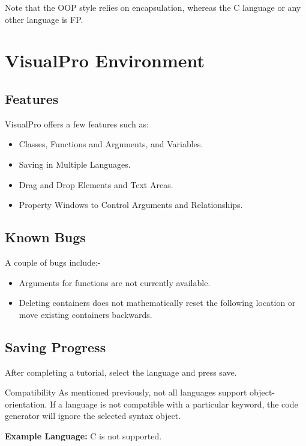 \documentclass[10pt]{article}
\begin{document}
    Note that the OOP style relies on encapsulation, whereas the C language or any other language is FP.

\newpage
\section{VisualPro Environment}
\label{sec:vp-env}
    \subsection{Features}
        VisualPro offers a few features such as:
        \begin{itemize}
            \item Classes, Functions and Arguments, and Variables.
            \item Saving in Multiple Languages.
            \item Drag and Drop Elements and Text Areas.
            \item Property Windows to Control Arguments and Relationships.
        \end{itemize}

    \subsection{Known Bugs}
        A couple of bugs include:-
        \begin{itemize}
            \item Arguments for functions are not currently available.
            \item Deleting containers does not mathematically reset the following location or move existing containers backwards.
        \end{itemize}

    \subsection{Saving Progress}
        After completing a tutorial, select the language and press save.

        \begin{tip}{Compatibility}
            As mentioned previously, not all languages support object-orientation. If a language is not compatible with a particular keyword, the code generator will ignore the selected syntax object.

            \textbf{Example Language:} C is not supported.
        \end{tip}
\end{document}
